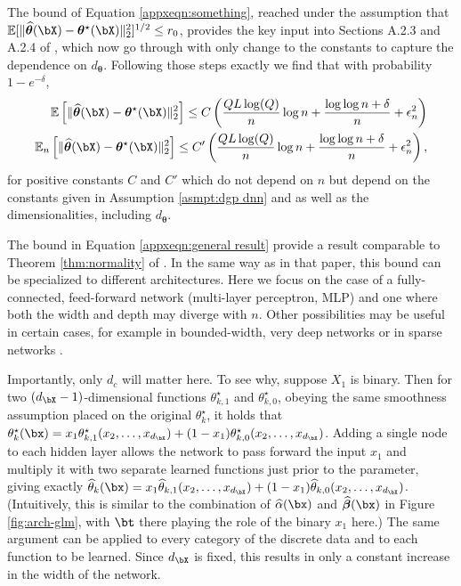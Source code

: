 \documentclass[12pt]{article}
\numberwithin{equation}{section}
\theoremstyle{definition}
\newcommand{\E}{\mathbb{E}}
\newcommand{\btheta}{\boldsymbol{\theta}}
\newcommand{\bbeta}{\boldsymbol{\beta}}
\newcommand{\ttrue}{\theta^\star}
\newcommand{\bttrue}{\btheta^\star}
\newcommand{\that}{\widehat{\theta}}
\newcommand{\bthat}{\bm{\widehat{\theta}}}
\newcommand{\ahat}{\widehat{\alpha}}
\newcommand{\bbhat}{\widehat{\bbeta}}
\newcommand{\dx}{d_{\bX}}  %
\newcommand{\dc}{d_c}  %
\newcommand{\dtheta}{d_{\btheta}}  %
\begin{document}
\begin{appendices}
The bound of Equation \eqref{appxeqn:something}, reached under the assumption that $\E[ \|\bthat(\bX) - \bttrue (\bX) \|_2^2 ]^{1/2} \leq r_0$, provides the key input into Sections A.2.3 and A.2.4 of \cite{Farrell-Liang-Misra2021_Ecma}, which now go through with only change to the constants to capture the dependence on $\dtheta$. Following those steps exactly we find that with probability $1 - e^{-\delta}$,
\begin{equation}
    \begin{split}
    \label{appxeqn:general result}
    \E \left[ \|\bthat(\bX) - \bttrue (\bX) \|_2^2 \right]        
    \leq C \left(  \frac{ Q L \log(Q) }{n}  \log n  + \frac{\log \log n + \delta}{n}  + \epsilon_n^2\right) \\
    \E_n \left[ \|\bthat(\bX) - \bttrue (\bX) \|_2^2 \right]        
    \leq C' \left(  \frac{ Q L \log(Q) }{n}  \log n  + \frac{\log \log n + \delta}{n}  + \epsilon_n^2\right),
    \end{split}
\end{equation}
for positive constants $C$ and $C'$ which do not depend on $n$ but depend on the constants given in Assumption \ref{asmpt:dgp dnn} and as well as the dimensionalities, including $\dtheta$.

The bound in Equation \eqref{appxeqn:general result} provide a result comparable to Theorem \ref{thm:normality} of \cite{Farrell-Liang-Misra2021_Ecma}. In the same way as in that paper, this bound can be specialized to different architectures. Here we focus on the case of a fully-connected, feed-forward network (multi-layer perceptron, MLP) and one where both the width and depth may diverge with $n$. Other possibilities may be useful in certain cases, for example in bounded-width, very deep networks \cite{Yarotsky2018_COLT,Hanin2019_Mathematics} or in sparse networks \cite{Kohler-Krzyzak-Langer2022_IEEE,Fan-Gu2024_JASA}. 

 Importantly, only $\dc$ will matter here. To see why, suppose $X_1$ is binary. Then for two $(\dx-1)$-dimensional functions $\ttrue_{k,1}$ and $\ttrue_{k,0}$, obeying the same smoothness assumption placed on the original $\ttrue_k$, it holds that $\ttrue_k(\bx) = x_{1} \ttrue_{k,1}(x_2, \ldots, x_{\dx}) + (1-x_{1}) \ttrue_{k,0}(x_2, \ldots, x_{\dx})$. Adding a single node to each hidden layer allows the network to pass forward the input $x_1$ and multiply it with two separate learned functions just prior to the parameter, giving exactly $\that_k(\bx) = x_1 \that_{k,1}(x_2, \ldots, x_{\dx}) + (1-x_1) \that_{k,0}(x_2, \ldots, x_{\dx})$. (Intuitively, this is similar to the combination of $\ahat(\bx)$ and $\bbhat(\bx)$ in Figure \ref{fig:arch-glm}, with $\bt$ there playing the role of the binary $x_1$ here.) The same argument can be applied to every category of the discrete data and to each function to be learned. Since $\dx$ is fixed, this results in only a constant increase in the width of the network. 


\end{appendices}
\end{document}
